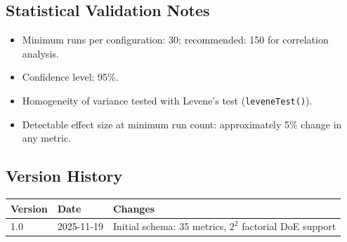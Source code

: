 \subsection{Statistical Validation Notes}

\begin{itemize}
  \item Minimum runs per configuration: 30; recommended: 150 for correlation analysis.
  \item Confidence level: 95\%.
  \item Homogeneity of variance tested with Levene's test (\texttt{leveneTest()}).
  \item Detectable effect size at minimum run count: approximately 5\% change in any metric.
\end{itemize}

\subsection{Version History}

\begin{center}
\begin{tabular}{lll}
\toprule
Version & Date & Changes \\
\midrule
1.0 & 2025-11-19 & Initial schema: 35 metrics, $2^2$ factorial DoE support \\
\bottomrule
\end{tabular}
\end{center}
